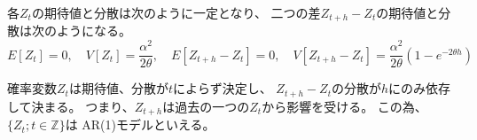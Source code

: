 \documentclass[12pt,b5paper]{ltjsarticle}
\begin{document}
\begin{enumerate}


      各$Z_t$の期待値と分散は次のように一定となり、
      二つの差$Z_{t+h}-Z_{t}$の期待値と分散は次のようになる。
      \begin{equation}
       E[Z_{t}]=0
        , \quad
        V[Z_{t}]=\frac{\alpha^2}{2\theta}
        , \quad
       E[Z_{t+h}-Z_{t}]=0
        , \quad
        V[Z_{t+h}-Z_{t}]=
        \frac{\alpha^2}{2\theta} (1-e^{-2\theta h})
      \end{equation}

      確率変数$Z_{t}$は期待値、分散が$t$によらず決定し、
      $Z_{t+h}-Z_{t}$の分散が$h$にのみ依存して決まる。
      つまり、$Z_{t+h}$は過去の一つの$Z_{t}$から影響を受ける。
      この為、$\{Z_{t};t\in\mathbb{Z}\}$は
      AR(1)モデルといえる。


      \hrulefill

\end{enumerate}





\hrulefill
\end{document}
